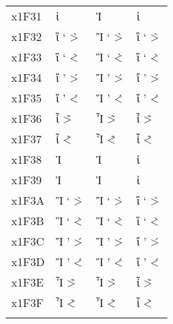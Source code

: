 \documentclass[a4paper]{article}
\newcommand*{\Greek}{\foreignlanguage{greek}}
\newcommand*{\Greek}{\ensuregreek}
\newcommand*{\Cases}[1]{%
  & \Greek{#1} & \Greek{\MakeUppercase{#1}} & \Greek{\MakeLowercase{#1}}
}
\begin{document}
\begin{longtable}{llll}
  x1F31 \Cases{ ἱ  \accdasia{\iota}                             \<{\iota}                                              } \\
  x1F32 \Cases{ ἲ  \accpsilivaria{\iota}                        \>`{\iota}                  \`>{\iota}                 } \\
  x1F33 \Cases{ ἳ  \accdasiavaria{\iota}                        \<`{\iota}                  \`<{\iota}                 } \\
  x1F34 \Cases{ ἴ  \accpsilioxia{\iota}                         \>'{\iota}                  \'>{\iota}                 } \\
  x1F35 \Cases{ ἵ  \accdasiaoxia{\iota}                         \<'{\iota}                  \'<{\iota}                 } \\
  x1F36 \Cases{ ἶ  \accpsiliperispomeni{\iota}                  \~>{\iota}                  \>~{\iota}                 } \\
  x1F37 \Cases{ ἷ  \accdasiaperispomeni{\iota}                  \~<{\iota}                  \<~{\iota}                 } \\
  x1F38 \Cases{ Ἰ  \accpsili{\Iota}                             \>{\Iota}                                              } \\
  x1F39 \Cases{ Ἱ  \accdasia{\Iota}                             \<{\Iota}                                              } \\
  x1F3A \Cases{ Ἲ  \accpsilivaria{\Iota}                        \>`{\Iota}                  \`>{\Iota}                 } \\
  x1F3B \Cases{ Ἳ  \accdasiavaria{\Iota}                        \<`{\Iota}                  \`<{\Iota}                 } \\
  x1F3C \Cases{ Ἴ  \accpsilioxia{\Iota}                         \>'{\Iota}                  \'>{\Iota}                 } \\
  x1F3D \Cases{ Ἵ  \accdasiaoxia{\Iota}                         \<'{\Iota}                  \'<{\Iota}                 } \\
  x1F3E \Cases{ Ἶ  \accpsiliperispomeni{\Iota}                  \~>{\Iota}                  \>~{\Iota}                 } \\
  x1F3F \Cases{ Ἷ  \accdasiaperispomeni{\Iota}                  \~<{\Iota}                  \<~{\Iota}                 } \\
                                                                                                                         \\

\end{longtable}
\end{document}
